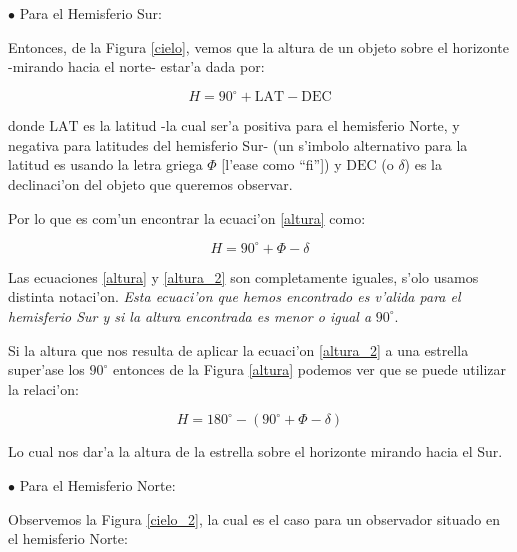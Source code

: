 \documentclass{article}
\begin{document}
\begin{enumerate}[a)]
\begin{enumerate} [i)]
$\bullet$ Para el Hemisferio Sur:

Entonces, de la Figura \ref{cielo}, vemos que la altura de un objeto sobre el horizonte -mirando hacia el norte- estar'a dada por:

\begin{equation} \label{altura}
H = 90^\circ + \text{LAT} - \text{DEC}
\end{equation} 

donde $\text{LAT}$ es la latitud -la cual ser'a positiva para el hemisferio Norte, y negativa para latitudes del hemisferio Sur- (un s'imbolo alternativo para la latitud es usando la letra griega $\Phi$ [l'ease como ``fi'']) y $\text{DEC}$ (o $\delta$) es la declinaci'on del objeto que queremos observar.


Por lo que es com'un encontrar la ecuaci'on \eqref{altura} como:

\begin{equation} \label{altura_2}
H = 90^\circ + \Phi - \delta
\end{equation}

Las ecuaciones \eqref{altura} y \eqref{altura_2} son completamente iguales, s'olo usamos distinta notaci'on.  \emph{Esta ecuaci'on que hemos encontrado es v'alida para el hemisferio Sur y si la altura encontrada es menor o igual a} $90^\circ$.

Si la altura que nos resulta de aplicar la ecuaci'on \eqref{altura_2} a una estrella super'ase los $90^\circ$ entonces de la Figura \ref{altura} podemos ver que se puede utilizar la relaci'on:

\begin{equation} \label{altura_3}
H = 180^\circ - (90^\circ + \Phi - \delta)
\end{equation}

Lo cual nos dar'a la altura de la estrella sobre el horizonte mirando hacia el Sur.

\newpage

$\bullet$ Para el Hemisferio Norte:

Observemos la Figura \ref{cielo_2}, la cual es el caso para un observador situado en el hemisferio Norte:


\end{enumerate}
\end{enumerate}
\end{document}
